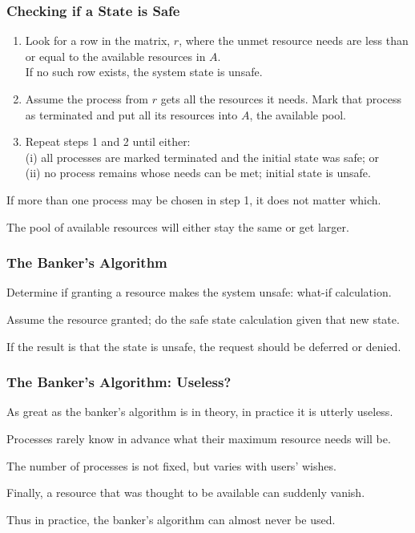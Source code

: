 \begin{frame}
\frametitle{Checking if a State is Safe}

\begin{enumerate}
	\item Look for a row in the matrix, $r$, where the unmet resource needs are less than or equal to the available resources in $A$.\\
	\quad If no such row exists, the system state is unsafe.
	\item Assume the process from $r$ gets all the resources it needs. Mark that process as terminated and put all its resources into $A$, the available pool.
	\item Repeat steps 1 and 2 until either:\\
	\quad (i) all processes are marked terminated and the initial state was safe; or \\
	\quad (ii) no process remains whose needs can be met; initial state is unsafe.
\end{enumerate}

If more than one process may be chosen in step 1, it does not matter which.

The pool of available resources will either stay the same or get larger.

\end{frame}

\begin{frame}
\frametitle{The Banker's Algorithm}

Determine if granting a resource makes the system unsafe: what-if calculation. 

Assume the resource granted; do the safe state calculation given that new state. 

If the result is that the state is unsafe, the request should be deferred or denied.

\end{frame}

\begin{frame}
\frametitle{The Banker's Algorithm: Useless?}

As great as the banker's algorithm is in theory, in practice it is utterly useless.

Processes rarely know in advance what their maximum resource needs will be. 

The number of processes is not fixed, but varies with users' wishes.

Finally, a resource that was thought to be available can suddenly vanish. 

Thus in practice, the banker's algorithm can almost never be used.


\end{frame}

